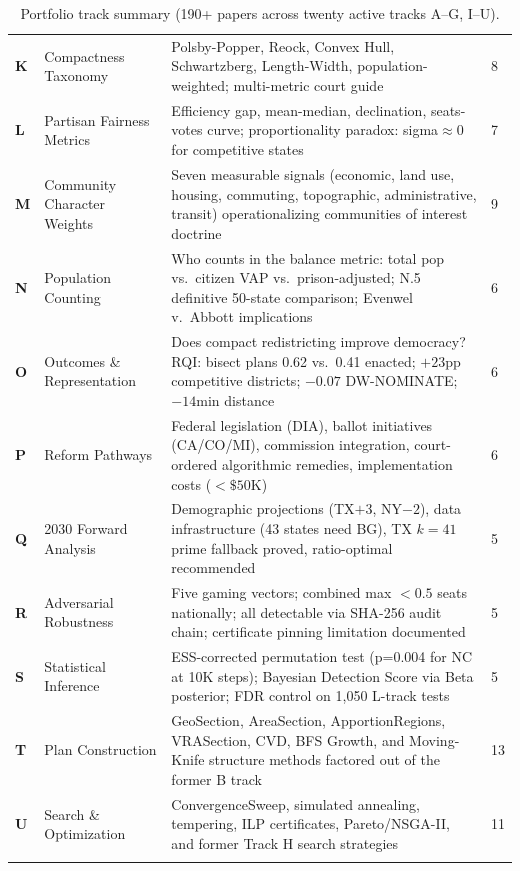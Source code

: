 \documentclass[12pt]{article}
\begin{document}
\begin{longtable}{@{}llp{5.2cm}l@{}}
\textbf{K} & Compactness Taxonomy &
    Polsby-Popper, Reock, Convex Hull, Schwartzberg, Length-Width,
    population-weighted; multi-metric court guide &
    8 \\[4pt]

\textbf{L} & Partisan Fairness Metrics &
    Efficiency gap, mean-median, declination, seats-votes curve;
    proportionality paradox: sigma$\approx$0 for competitive states &
    7 \\[4pt]

\textbf{M} & Community Character Weights &
    Seven measurable signals (economic, land use, housing, commuting,
    topographic, administrative, transit) operationalizing communities
    of interest doctrine &
    9 \\[4pt]

\textbf{N} & Population Counting &
    Who counts in the balance metric: total pop vs.\ citizen VAP vs.\ prison-adjusted;
    N.5 definitive 50-state comparison; Evenwel v.\ Abbott implications &
    6 \\[4pt]

\textbf{O} & Outcomes \& Representation &
    Does compact redistricting improve democracy? RQI: bisect plans 0.62 vs.\ 0.41
    enacted; $+23$pp competitive districts; $-0.07$ DW-NOMINATE; $-14$min distance &
    6 \\[4pt]

\textbf{P} & Reform Pathways &
    Federal legislation (DIA), ballot initiatives (CA/CO/MI), commission integration,
    court-ordered algorithmic remedies, implementation costs ($<\$50$K) &
    6 \\[4pt]

\textbf{Q} & 2030 Forward Analysis &
    Demographic projections (TX$+3$, NY$-2$), data infrastructure (43 states need BG),
    TX $k=41$ prime fallback proved, ratio-optimal recommended &
    5 \\[4pt]

\textbf{R} & Adversarial Robustness &
    Five gaming vectors; combined max $< 0.5$ seats nationally; all detectable
    via SHA-256 audit chain; certificate pinning limitation documented &
    5 \\[4pt]

\textbf{S} & Statistical Inference &
    ESS-corrected permutation test (p=0.004 for NC at 10K steps); Bayesian Detection
    Score via Beta posterior; FDR control on 1{,}050 L-track tests &
    5 \\[4pt]

\textbf{T} & Plan Construction &
    GeoSection, AreaSection, ApportionRegions, VRASection, CVD, BFS Growth,
    and Moving-Knife structure methods factored out of the former B track &
    13 \\[4pt]

\textbf{U} & Search \& Optimization &
    ConvergenceSweep, simulated annealing, tempering, ILP certificates,
    Pareto/NSGA-II, and former Track H search strategies &
    11 \\

\bottomrule
\caption{Portfolio track summary (190+ papers across twenty active tracks A--G, I--U).}
\label{tab:tracks}
\end{longtable}
\end{document}
